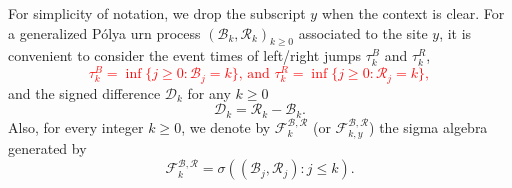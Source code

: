 \documentclass[twoside,12pt,a4paper]{article}
\numberwithin{equation}{section}
\newcommand{\edt}[1]{\textcolor{red}{#1}} %
\begin{document}
	For simplicity of notation, we drop the subscript $y$ when the context is clear.
	For a generalized P\'{o}lya urn process $(\mathcal{B}_k,\mathcal{R}_k )_{k\geq 0}$ associated to the site $y$, it is convenient to consider the event times of left/right jumps $\tau^B_k$ and $ \tau^R_k $,	
	\edt{$$ \tau^B_k = \inf\{ j\geq 0: \mathcal{B}_{j} =k   \}  \mbox{, and } \tau^R_k = \inf\{ j\geq 0: \mathcal{R}_{j} =k   \} ,
	$$}
	and the signed difference $\mathcal{D}_{k} $ for any $k\geq 0$
	\begin{equation}\label{eq:signed difference}
		\mathcal{D}_k  =\mathcal{R}_k -\mathcal{B}_k.  
	\end{equation}
	Also, for every integer $k\geq 0$, we denote by $\mathcal{F}^{\mathcal{B},\mathcal{R}}_k$ (or $\mathcal{F}^{\mathcal{B},\mathcal{R}}_{k,y}$) the sigma algebra generated by  $$\mathcal{F}^{\mathcal{B},\mathcal{R}}_k = \sigma\left((\mathcal{B}_j,\mathcal{R}_j ): j\leq k \right).$$  
	
\end{document}
